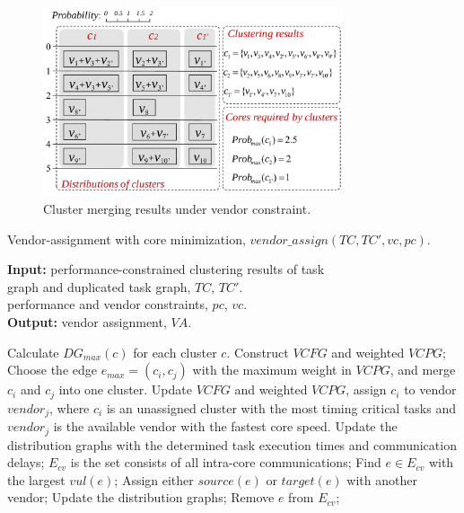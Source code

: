 \documentclass[10pt,journal, compsoc]{IEEEtran}
\begin{document}
\begin{figure}[!t]
\centering
\hspace*{-0.8em}
\includegraphics[width=8.8cm]{figure/vcg_result.pdf}
\caption{Cluster merging results under vendor constraint.}
\label{fig:assign_result}
\end{figure}

\begin{algorithm}[!b]
\caption{Vendor-assignment with core minimization, $vendor\_assign(TC, TC', vc, pc)$.}
\label{alg:VA}
{\textbf{Input:}}
performance-constrained clustering results of task\\
\hspace*{2.4em}  graph and duplicated task graph, $TC$, $TC'$.\\
\hspace*{2.4em} performance and vendor constraints, $pc$, $vc$.\\
{\textbf{Output:}} vendor assignment, $VA$.
\begin{algorithmic}[1]
\STATE Calculate $DG_{max}(c)$ for each cluster $c$.
\STATE Construct $VCFG$ and weighted $VCPG$;
\STATE Choose the edge $e_{max}=(c_i,c_j)$ with the maximum weight in $VCPG$, and merge $c_i$ and $c_j$ into one cluster.%
\STATE Update $VCFG$ and weighted $VCPG$,
\ENDWHILE
    \STATE assign $c_i$ to vendor $vendor_j$, where $c_i$ is an unassigned cluster with the most timing critical tasks and $vendor_j$ is the available vendor with the fastest core speed.
\ENDWHILE
\STATE Update the distribution graphs with the determined task execution times and communication delays;
\STATE $E_{cv}$ is the set consists of all intra-core communications;
\STATE Find $e\in E_{cv}$ with the largest $vul(e)$;
\STATE Assign either $source(e)$ or $target(e)$ with another vendor;
\STATE Update the distribution graphs;
\ENDIF
\STATE Remove $e$ from $E_{cv}$;
\ENDWHILE
\end{algorithmic}
\end{algorithm}
\end{document}
